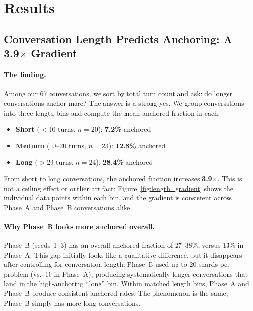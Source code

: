 \documentclass{article}
\begin{document}
\section{Results}
\label{sec:results}

\subsection{Conversation Length Predicts Anchoring: A \texorpdfstring{3.9$\times$}{3.9x} Gradient}
\label{subsec:length}

\paragraph{The finding.}
Among our 67 conversations, we sort by total turn count and ask:
do longer conversations anchor more?
The answer is a strong yes.
We group conversations into three length bins and compute the
mean anchored fraction in each:

\begin{itemize}
  \item \textbf{Short} ($<$10 turns, $n=20$): \textbf{7.2\%} anchored
  \item \textbf{Medium} (10--20 turns, $n=23$): \textbf{12.8\%} anchored
  \item \textbf{Long} ($>$20 turns, $n=24$): \textbf{28.4\%} anchored
\end{itemize}

From short to long conversations, the anchored fraction increases
\textbf{3.9$\times$}.
This is not a ceiling effect or outlier artifact: Figure~\ref{fig:length_gradient}
shows the individual data points within each bin, and the gradient
is consistent across Phase~A and Phase~B conversations alike.

\paragraph{Why Phase~B looks more anchored overall.}
Phase~B (seeds~1--3) has an overall anchored fraction of 27--38\%,
versus 13\% in Phase~A.
This gap initially looks like a qualitative difference, but it
disappears after controlling for conversation length: Phase~B used
up to 20 shards per problem (vs.\ 10 in Phase~A), producing
systematically longer conversations that land in the high-anchoring
``long'' bin.
Within matched length bins, Phase~A and Phase~B produce consistent
anchored rates.
The phenomenon is the same; Phase~B simply has more long
conversations.
\end{document}
